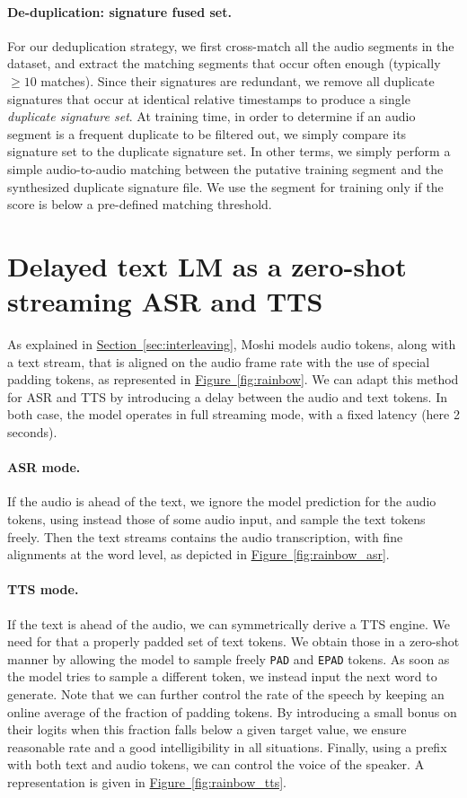 \paragraph{De-duplication: signature fused set. } 
For our deduplication strategy, we first cross-match all the audio segments in the dataset, and extract the matching segments that occur often enough (typically $\geq 10$ matches). Since their signatures are redundant, we remove all duplicate signatures that occur at identical relative timestamps to produce a single \emph{duplicate signature set}. At training time, in order to determine if an audio segment is a frequent duplicate to be filtered out, we simply compare its signature set to the duplicate signature set. In other terms, we simply perform  a simple audio-to-audio matching between the putative training segment and the synthesized duplicate signature file. We use the segment for training only if the score is below a pre-defined matching threshold. 


\section{Delayed text LM as a zero-shot streaming ASR and TTS}
\label{app:streaming_tts}
As explained in \hyperref[sec:interleaving]{Section~\ref{sec:interleaving}}, Moshi models audio tokens, along
with a text stream, that is aligned on the audio frame rate with the use of special padding tokens, as represented in \hyperref[fig:rainbow]{Figure~\ref{fig:rainbow}}. We can adapt this method for ASR and TTS by introducing a delay between the audio and text tokens. In both case, the model operates in full streaming mode, with a fixed latency (here 2 seconds).
    
\paragraph{ASR mode.} If the audio is ahead of the text, we ignore the model prediction for the audio tokens, using instead those of some audio input, and sample the text tokens freely. Then the text streams contains the audio transcription, with fine alignments at the word level, as depicted in \hyperref[fig:rainbow_asr]{Figure~\ref{fig:rainbow_asr}}.
\paragraph{TTS mode.} If the text is ahead of the audio, we can symmetrically derive a TTS engine. We need for that a properly padded set of text tokens. We obtain those in a zero-shot manner by allowing the model to sample freely \texttt{PAD} and \texttt{EPAD} tokens. As soon as the model tries to sample a different token, we instead input the next word to generate. Note that we can further control the rate of the speech by keeping an online average of the fraction of padding tokens. By introducing a small bonus on their logits when this fraction falls below a given target value, we ensure reasonable rate and a good intelligibility in all situations. Finally, using a prefix with both text and audio tokens, we can control the voice of the speaker. A representation is given in \hyperref[fig:rainbow_tts]{Figure~\ref{fig:rainbow_tts}}.
